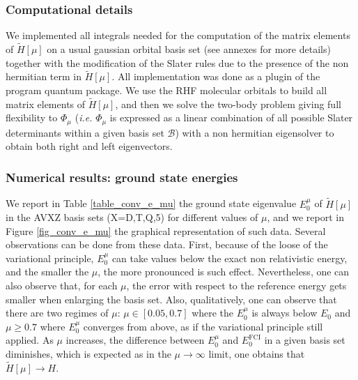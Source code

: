 \documentclass[aip,jcp,reprint,noshowkeys,superscriptaddress]{revtex4-1}
\newcommand{\basis}[0]{\mathcal{B}}
\begin{document}
\subsubsection{Computational details}
We implemented all integrals needed for the computation of the matrix elements of $\tilde{H}[\mu]$ on a usual gaussian orbital basis set (see annexes for more details) together with the modification of the Slater rules due to the presence of the non hermitian term in $\tilde{H}[\mu]$. 
All implementation was done as a plugin of the program quantum package\cite{QP2}. 
We use the RHF molecular orbitals to build all matrix elements of $\tilde{H}[\mu]$, and then we solve the two-body problem giving full flexibility to $\Phi_\mu$ (\textit{i.e.} $\Phi_\mu$ is expressed as a linear combination of all possible Slater determinants within a given basis set $\basis$) with a non hermitian eigensolver to obtain both right and left eigenvectors. 

\subsubsection{Numerical results: ground state energies}
\label{sec:total_e}
We report in Table \ref{table_conv_e_mu} the ground state eigenvalue $E_0^\mu$ of $\tilde{H}[\mu]$ in the AVXZ basis sets (X=D,T,Q,5) for different values of $\mu$, and we report in Figure \ref{fig_conv_e_mu} the graphical representation of such data. 
Several observations can be done from these data. First, because of the loose of the variational principle, $E_0^{\mu}$ can take values below the exact non relativistic energy, and the smaller the $\mu$, the more pronounced is such effect. 
Nevertheless, one can also observe that, for each $\mu$, the error with respect to the reference energy gets smaller  
when enlarging the basis set. Also, qualitatively, one can observe that there are two regimes of $\mu$: $\mu \in[0.05,0.7]$ where the $E_0^\mu$ is always below $E_0$ and $\mu\ge 0.7$ where $E_0^\mu$ converges from above, as if the variational principle still applied. 
As $\mu$ increases, the difference between $E_0^\mu$ and $E_0^\text{FCI}$ in a given basis set diminishes, 
which is expected as in the $\mu \rightarrow \infty$ limit, one obtains that  $\tilde{H}[\mu] \rightarrow H$. 
\end{document}
